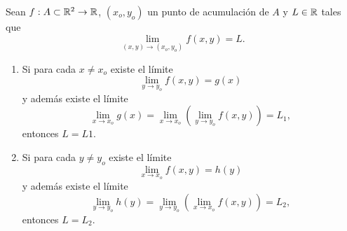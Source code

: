 \begin{propertie} \label{prop:lim_ite}
  Sean $f: A \subset \mathbb{R}^2 \to \mathbb{R}$, $(x_o,y_o)$ un punto de acumulaci\'on de $A$ y $L \in \mathbb{R}$ tales que
  \[
   \lim_{(x,y) \to (x_o,y_o)} f(x,y) = L.
  \]
  \begin{enumerate} %
   \item Si para cada $x \ne x_o$ existe el l\'imite
  \[
   \lim_{y \to y_o} f(x,y) = g(x)
  \]
  y adem\'as existe el l\'imite
  \[
   \lim_{x \to x_o} g(x) = \lim_{x \to x_o} \left( \lim_{y \to y_o} f(x,y) \right) = L_1,
  \]  
  entonces $L = L1$.
  \item Si para cada $y \ne y_o$ existe el l\'imite
  \[
   \lim_{x \to x_o} f(x,y) = h(y)
  \]
  y adem\'as existe el l\'imite
  \[
   \lim_{y \to y_o} h(y) = \lim_{y \to y_o} \left( \lim_{x \to x_o} f(x,y) \right) = L_2, 
  \]
  entonces $L = L_2$.
  \end{enumerate}
\end{propertie}


